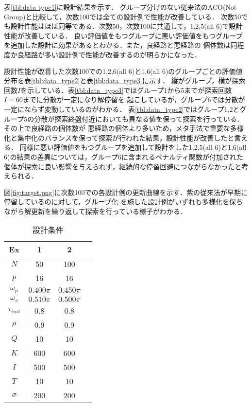 \documentclass[dvipdfmx,9pt]{ieej}
\begin{document}
表\ref{tbl:data type1}に設計結果を示す．
グループ分けのない従来法のACO(Not Group)と比較して，次数100では全ての設計例で性能が改善している．
次数50でも設計性能はほぼ同等である．次数50，次数100に共通して，1,2,5(all 6)で設計性能が改善している．
良い評価値をもつグループに悪い評価値をもつグループを追加した設計に効果があるとわかる．また，良経路と悪経路の
個体数は同程度か良経路が多い設計例で性能が改善するのが明らかになった．

設計性能が改善した次数100での1,2,6(all 6)と1,6(all 6)のグループごとの評価値分布を表\ref{tbl:data_type2}と表\ref{tbl:data_type3}に示す．
縦がグループ，横が探索回数$I$を示している．表\ref{tbl:data_type3}ではグループ1から5までが探索回数$I=60$までに分散が一定になり解停留を
起こしているが，グループ6では分散が一定にならず変動しているのがわかる．
表\ref{tbl:data_type2}ではグループ1,2とグループ5の分散が探索終盤付近においても異なる値を保って探索を行っている．その上で良経路の個体数が
悪経路の個体より多いため，メタ手法で重要な多様化と集中化のバランスを保って探索が行われた結果，設計性能が改善したと言える．
同様に悪い評価値をもつグループを追加して設計をした1,2,5(all 6)と1,6(all 6)の結果の差異については，グループ6に含まれるペナルティ関数が付加された
個体が探索に良い影響を与えられず，継続的な停留回避につながらなかったと考えられる．

図\ref{fig:target.png}に次数100での各設計例の更新曲線を示す．紫の従来法が早期に停留しているのに対して，グループ化
を施した設計例がいずれも多様化を保ちながら解更新を繰り返して探索を行っている様子がわかる．

\begin{table}[t]
\caption{設計条件}
\vspace{0.5zh}
\label{tbl:condition2}
\begin{center}
 \begin{tabular}{c|c|cl} \hline 
	Ex  & 1 & 2 \\ \hline
	$N$ & 50 & 100 	 \\ \hline
	$p$ & 16 & 16   \\ \hline
	$\omega_{p}$ & $0.400\pi$ & $0.450\pi$  \\ \hline
	$\omega_{s}$ & $0.510\pi$ & $0.500\pi$  \\ \hline
	$\tau_{init}$ & 0.8 & 0.8 \\ \hline
	$\rho$ & 0.9 & 0.9   \\ \hline
	$Q$ & 10 & 10   \\ \hline
	$K$ & 600 & 600  \\ \hline
	$I$ & 500 & 500   \\ \hline
	$T$ & 10 & 10 \\ \hline
	$\sigma$ & 200 & 200  \\ \hline
 \end{tabular}
\end{center}
\end{table}
\end{document}
